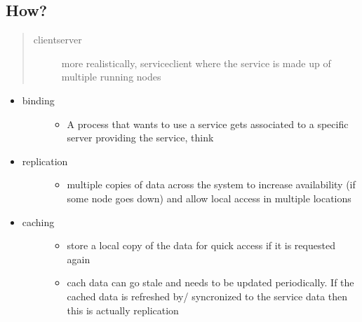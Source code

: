 \documentclass[letterpaper,10pt,english]{sphinxmanual}
\begin{document}
\subsection{How?}
\label{\detokenize{google_article:how}}\begin{quote}\begin{description}
\item[{client\sphinxhyphen{}server}] \leavevmode
more realistically, service\sphinxhyphen{}client where the service is
made up of multiple running nodes

\end{description}\end{quote}
\begin{itemize}
\item {} \begin{description}
\item[{binding}] \leavevmode\begin{itemize}
\item {} 
A process that wants to use a service gets associated to
a specific server providing the service, think 

\end{itemize}

\end{description}

\item {} \begin{description}
\item[{replication}] \leavevmode\begin{itemize}
\item {} 
multiple copies of data across the system to increase availability
(if some node goes down) and allow local access in multiple locations

\end{itemize}

\end{description}

\item {} \begin{description}
\item[{caching}] \leavevmode\begin{itemize}
\item {} 
store a local copy of the data for quick access if it is requested again

\item {} 
cach data can go stale and needs to be updated periodically. If the cached
data is refreshed by/ syncronized to the service data then this is actually
replication

\end{itemize}

\end{description}

\end{itemize}
\end{document}
